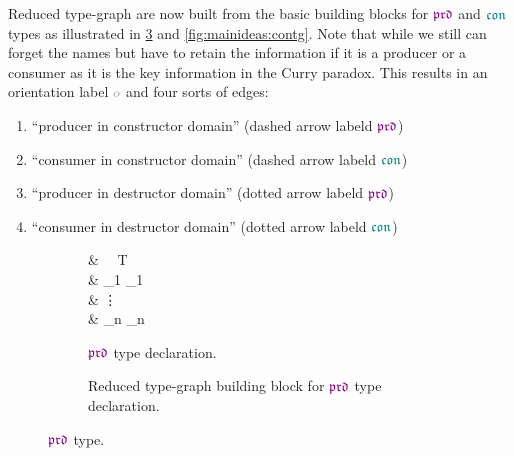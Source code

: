 Reduced type-graph are now built from the basic building blocks for $\polprd$ and $\polcon$ types as illustrated in \cref{fig:mainideas:prdtg} and \cref{fig:mainideas:contg}.
Note that while we still can forget the names but have to retain the information if it is a producer or a consumer as it is the key information in the Curry paradox.
This results in an orientation label $\pol$ and four sorts of edges:
\begin{enumerate}
  \item
    \enquote{producer in constructor domain} (dashed arrow labeld $\polprd$)
  \item
    \enquote{consumer in constructor domain} (dashed arrow labeld $\polcon$)
  \item
    \enquote{producer in destructor domain} (dotted arrow labeld $\polprd$)
  \item
    \enquote{consumer in destructor domain} (dotted arrow labeld $\polcon$)
\end{enumerate}

\begin{figure}[H]
  \begin{subfigure}[b]{0.25\textwidth}
    \begin{codealign}
      &
        \polprd\ \type\ T\ \where
      \\[-4pt]
      &\quad
        _{1} \Delta_{1}
      \\[-4pt]
      &\quad\quad
        \vdots
      \\[-4pt]
      &\quad
        _{n} \Delta_{n}
    \end{codealign}
    \caption{$\polprd$ type declaration.}
    \label{fig:mainideas:prdtg:prdt}
  \end{subfigure}
  \begin{subfigure}[b]{0.7\textwidth}
    \caption{Reduced type-graph building block for $\polprd$ type declaration.}
    \label{fig:mainideas:prdtg:tg}
  \end{subfigure}
  \caption{$\polprd$ type.}
  \label{fig:mainideas:prdtg}
\end{figure}

